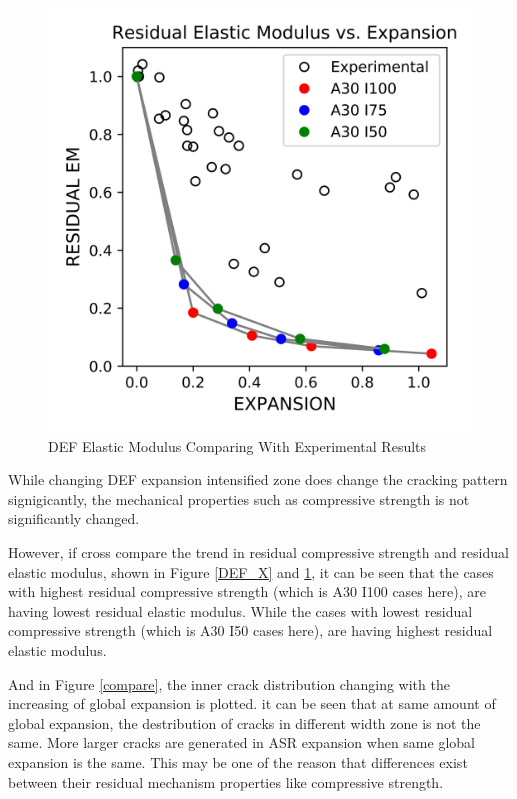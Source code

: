 \begin{figure}[ht!]
\centering
\includegraphics[width=.8\linewidth]{Files/CS_plot/DEFEM3.png}
  \caption{DEF Elastic Modulus Comparing With Experimental Results}
  \label{DEF_X_EM}
\end{figure}

While changing DEF expansion intensified zone does change the cracking pattern signigicantly, the mechanical properties such as compressive strength is not significantly changed.

However, if cross compare the trend in residual compressive strength and residual elastic modulus, shown in Figure \ref{DEF_X} and \ref{DEF_X_EM}, it can be seen that the cases with highest residual compressive strength (which is A30 I100 cases here), are having lowest residual elastic modulus. While the cases with lowest residual compressive strength (which is A30 I50 cases here), are having highest residual elastic modulus.

And in Figure \ref{compare}, the inner crack distribution changing with the increasing of global expansion is plotted. it can be seen that at same amount of global expansion, the destribution of cracks in different width zone is not the same. More larger cracks are generated in ASR expansion when same global expansion is the same. This may be one of the reason that differences exist between their residual mechanism properties like compressive strength.

